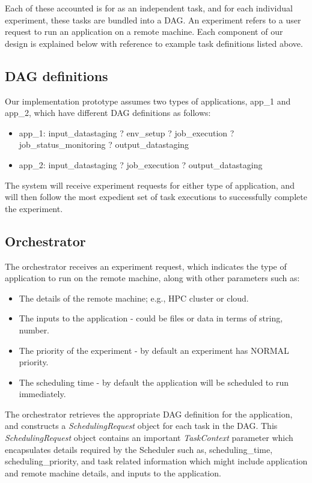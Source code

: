 \documentclass[sigconf]{acmart}
\begin{document}
Each of these accounted is for as an independent task, and for each individual experiment, these tasks are bundled into a DAG. An experiment refers to a user request to run an application on a remote machine. Each component of our design is explained below with reference to example task definitions listed above.

\subsection{DAG definitions}
Our implementation prototype assumes two types of applications, app_1 and app_2, which have different DAG definitions as follows:
\begin{itemize}
\item app_1: input_datastaging ? env_setup ? job_execution ? job_status_monitoring ? output_datastaging
\item app_2: input_datastaging ? job_execution ? output_datastaging
\end{itemize}

The system will receive experiment requests for either type of application, and will then follow the most expedient set of task executions to successfully complete the experiment.

\subsection{Orchestrator}
The orchestrator receives an experiment request, which indicates the type of application to run on the remote machine, along with other parameters such as:
\begin{itemize}
\item The details of the remote machine; e.g., HPC cluster or cloud.
\item The inputs to the application - could be files or data in terms of string, number.
\item The priority of the experiment - by default an experiment has NORMAL priority.
\item The scheduling time - by default the application will be scheduled to run immediately.
\end{itemize}

The orchestrator retrieves the appropriate DAG definition for the application, and constructs a \textit{SchedulingRequest} object for each task in the DAG. This \textit{SchedulingRequest} object contains an important \textit{TaskContext} parameter which encapsulates details required by the Scheduler such as, scheduling_time, scheduling_priority, and task related information which might include application and remote machine details, and inputs to the application.
\end{document}
